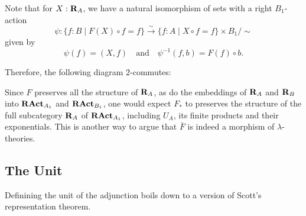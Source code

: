 \begin{remark}
  Note that for $ X : \mathbf{R}_A $, we have a natural isomorphism of sets with a right $ B_1 $-action
  \[ \psi: \{ f : B \mid F(X) \circ f = f \} \xrightarrow \sim \{ f : A \mid X \circ f = f \} \times B_1 / \sim \]
  given by
  \[ \psi(f) = (X, f) \quad \text{and} \quad \psi^{-1}(f, b) = F(f) \circ b. \]

  Therefore, the following diagram $ 2 $-commutes:
  \begin{center}
  \end{center}
  Since $ F $ preserves all the structure of $ \mathbf{R}_A $, as do the embeddings of $ \mathbf{R}_A $ and $ \mathbf{R}_B $ into $ \mathbf{RAct}_{A_1} $ and $ \mathbf{RAct}_{B_1} $, one would expect $ F_* $ to preserves the structure of the full subcategory $ \mathbf{R}_A $ of $ \mathbf{RAct}_{A_1} $, including $ U_A $, its finite products and their exponentials. This is another way to argue that $ \bar F $ is indeed a morphism of $ \lambda $-theories.
\end{remark}

\subsection{The Unit}

Definining the unit of the adjunction boils down to a version of Scott's representation theorem.

